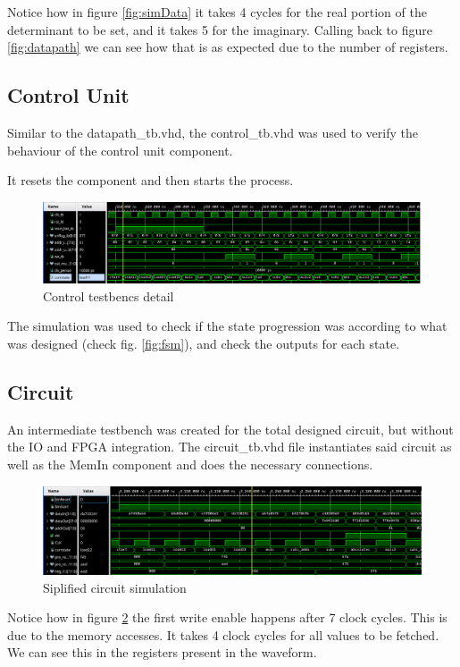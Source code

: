 \documentclass[12pt]{article}
\begin{document}
Notice how in figure \ref{fig:simData} it takes 4 cycles for the real portion of the determinant to be set, and it takes 5 for the imaginary. Calling back to figure \ref{fig:datapath} we can see how that is as expected due to the number of registers.

\subsection{Control Unit}
Similar to the datapath\_tb.vhd, the control\_tb.vhd was used to verify the behaviour of the control unit component.

It resets the component and then starts the process. 

\begin{figure}[!htp]
	\centering
	\includegraphics[width=0.7\linewidth]{images/simControl.png}
	\caption{Control testbencs detail}
	\label{fig:simControl}
\end{figure}

The simulation was used to check if the state progression was according to what was designed (check fig. \ref{fig:fsm}), and check the outputs for each state.

\subsection{Circuit}
An intermediate testbench was created for the total designed circuit, but without the IO and FPGA integration.
The circuit\_tb.vhd file instantiates said circuit as well as the MemIn component and does the necessary connections.

\begin{figure}[!htp]
	\centering
	\includegraphics[width=0.7\linewidth]{images/simCircuit.png}
	\caption{Siplified circuit simulation}
	\label{fig:simCircuit}
\end{figure}

Notice how in figure \ref{fig:simCircuit} the first write enable happens after 7 clock cycles. This is due to the memory accesses. It takes 4 clock cycles for all values to be fetched. We can see this in the registers present in the waveform.
\end{document}
